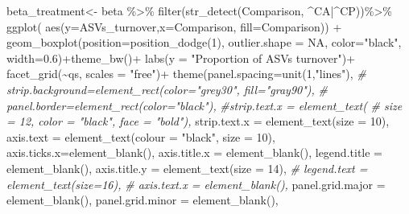 \documentclass[]{interact}
\theoremstyle{plain}%
\theoremstyle{definition}
\theoremstyle{remark}
\newenvironment{Shaded}{\begin{snugshade}}{\end{snugshade}}
\newcommand{\AttributeTok}[1]{\textcolor[rgb]{0.77,0.63,0.00}{#1}}
\newcommand{\CommentTok}[1]{\textcolor[rgb]{0.56,0.35,0.01}{\textit{#1}}}
\newcommand{\ConstantTok}[1]{\textcolor[rgb]{0.00,0.00,0.00}{#1}}
\newcommand{\DecValTok}[1]{\textcolor[rgb]{0.00,0.00,0.81}{#1}}
\newcommand{\FloatTok}[1]{\textcolor[rgb]{0.00,0.00,0.81}{#1}}
\newcommand{\FunctionTok}[1]{\textcolor[rgb]{0.00,0.00,0.00}{#1}}
\newcommand{\NormalTok}[1]{#1}
\newcommand{\OtherTok}[1]{\textcolor[rgb]{0.56,0.35,0.01}{#1}}
\newcommand{\SpecialCharTok}[1]{\textcolor[rgb]{0.00,0.00,0.00}{#1}}
\newcommand{\StringTok}[1]{\textcolor[rgb]{0.31,0.60,0.02}{#1}}
\begin{document}
\begin{Shaded}
\begin{Highlighting}[]
\NormalTok{beta\_treatment}\OtherTok{\textless{}{-}}\NormalTok{ beta }\SpecialCharTok{\%\textgreater{}\%}
  \FunctionTok{filter}\NormalTok{(}\FunctionTok{str\_detect}\NormalTok{(Comparison, }\StringTok{\textquotesingle{}\^{}CA|\^{}CP\textquotesingle{}}\NormalTok{))}\SpecialCharTok{\%\textgreater{}\%} \FunctionTok{ggplot}\NormalTok{(}
    \FunctionTok{aes}\NormalTok{(}\AttributeTok{y=}\StringTok{\textasciigrave{}}\AttributeTok{ASVs\_turnover}\StringTok{\textasciigrave{}}\NormalTok{,}\AttributeTok{x=}\NormalTok{Comparison,  }\AttributeTok{fill=}\NormalTok{Comparison)) }\SpecialCharTok{+}
  \FunctionTok{geom\_boxplot}\NormalTok{(}\AttributeTok{position=}\FunctionTok{position\_dodge}\NormalTok{(}\DecValTok{1}\NormalTok{), }\AttributeTok{outlier.shape =} \ConstantTok{NA}\NormalTok{, }\AttributeTok{color=}\StringTok{"black"}\NormalTok{,}
               \AttributeTok{width=}\FloatTok{0.6}\NormalTok{)}\SpecialCharTok{+}\FunctionTok{theme\_bw}\NormalTok{()}\SpecialCharTok{+}
  \FunctionTok{labs}\NormalTok{(}\AttributeTok{y =} \StringTok{"Proportion of ASVs turnover"}\NormalTok{)}\SpecialCharTok{+}
  \FunctionTok{facet\_grid}\NormalTok{(}\SpecialCharTok{\textasciitilde{}}\NormalTok{qs, }\AttributeTok{scales =} \StringTok{"free"}\NormalTok{)}\SpecialCharTok{+}
  \FunctionTok{theme}\NormalTok{(}\AttributeTok{panel.spacing=}\FunctionTok{unit}\NormalTok{(}\DecValTok{1}\NormalTok{,}\StringTok{"lines"}\NormalTok{),}
        \CommentTok{\# strip.background=element\_rect(color="grey30", fill="gray90"),}
        \CommentTok{\# panel.border=element\_rect(color="black"),}
        \CommentTok{\#strip.text.x = element\_text(}
        \CommentTok{\#  size = 12, color = "black", face = "bold"),}
        \AttributeTok{strip.text.x =} \FunctionTok{element\_text}\NormalTok{(}\AttributeTok{size =} \DecValTok{10}\NormalTok{),}
        \AttributeTok{axis.text =}  \FunctionTok{element\_text}\NormalTok{(}\AttributeTok{colour =} \StringTok{"black"}\NormalTok{, }\AttributeTok{size =} \DecValTok{10}\NormalTok{),}
        \AttributeTok{axis.ticks.x=}\FunctionTok{element\_blank}\NormalTok{(), }
        \AttributeTok{axis.title.x =} \FunctionTok{element\_blank}\NormalTok{(), }
        \AttributeTok{legend.title =} \FunctionTok{element\_blank}\NormalTok{(),}
        \AttributeTok{axis.title.y =} \FunctionTok{element\_text}\NormalTok{(}\AttributeTok{size =} \DecValTok{14}\NormalTok{),}
        \CommentTok{\# legend.text = element\_text(size=16), }
        \CommentTok{\# axis.text.x = element\_blank(),}
        \AttributeTok{panel.grid.major =} \FunctionTok{element\_blank}\NormalTok{(), }\AttributeTok{panel.grid.minor =} \FunctionTok{element\_blank}\NormalTok{(),}

\end{Highlighting}
\end{Shaded}
\end{document}
